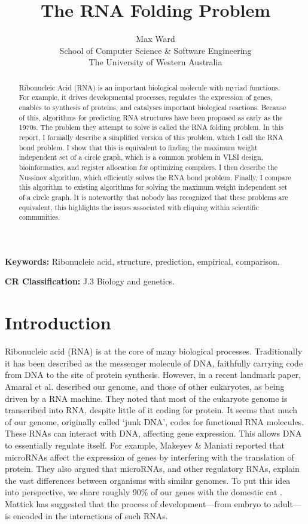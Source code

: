 \documentclass[12pt, a4paper]{article}
\title{The RNA Folding Problem}
\author{Max Ward \\
School of Computer Science \& Software Engineering \\
The University of Western Australia}
\begin{document}
\maketitle

\begin{abstract}
Ribonucleic Acid (RNA) is an important biological molecule with myriad functions. For example, it drives developmental processes, regulates the expression of genes, enables to synthesis of proteins, and catalyses important biological reactions. Because of this, algorithms for predicting RNA structures have been proposed as early as the 1970s. The problem they attempt to solve is called the RNA folding problem. In this report, I formally describe a simplified version of this problem, which I call the RNA bond problem. I show that this is equivalent to finding the maximum weight independent set of a circle graph, which is a common problem in VLSI design, bioinformatics, and register allocation for optimizing compilers. I then describe the Nussinov algorithm, which efficiently solves the RNA bond problem. Finally, I compare this algorithm to existing algorithms for solving the maximum weight independent set of a circle graph. It is noteworthy that nobody has recognized that these problems are equivalent, this highlights the issues associated with cliquing within scientific communities.
\end{abstract}


{\bf Keywords:} Ribonucleic acid, structure, prediction, empirical, comparison.

{\bf CR Classification:} J.3 Biology and genetics.

\clearpage


\section{Introduction}
Ribonucleic acid (RNA) is at the core of many biological processes. Traditionally it has been described as the messenger molecule of DNA, faithfully carrying code from DNA to the site of protein synthesis. However, in a recent landmark paper, Amaral et al. \cite{amaral2008eukaryotic} described our genome, and those of other eukaryotes, as being driven by a RNA machine. They noted that most of the eukaryote genome is transcribed into RNA, despite little of it coding for protein. It seems that much of our genome, originally called `junk DNA', codes for functional RNA molecules. These RNAs can interact with DNA, affecting gene expression. This allows DNA to essentially regulate itself. For example, Makeyev \& Maniati \cite{makeyev2008multilevel} reported that microRNAs affect the expression of genes by interfering with the translation of protein. They also argued that microRNAs, and other regulatory RNAs, explain the vast differences between organisms with similar genomes. To put this idea into perspective, we share roughly 90\% of our genes with the domestic cat \cite{pontius2007initial}. Mattick \cite{mattick2007new} has suggested that the process of development---from embryo to adult---is encoded in the interactions of such RNAs.
\end{document}
